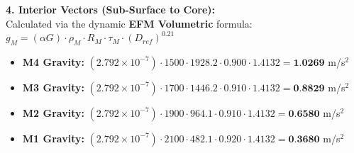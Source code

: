 \documentclass[11pt, a4paper]{article}
\begin{document}
  \vspace{0.5em}
  \noindent \textbf{4. Interior Vectors (Sub-Surface to Core):} \\[0.5em]
  \hspace*{1em} Calculated via the dynamic \textbf{EFM Volumetric} formula: $g_M = (\alpha G) \cdot \rho_{M} \cdot R_M \cdot \tau_M \cdot (D_{ref})^{0.21}$
  \begin{itemize}
    \item \textbf{M4 Gravity:} $(2.792 \times 10^{-7}) \cdot 1500 \cdot 1928.2 \cdot 0.900 \cdot 1.4132 = \textbf{1.0269}$ m/s$^2$
    \item \textbf{M3 Gravity:} $(2.792 \times 10^{-7}) \cdot 1700 \cdot 1446.2 \cdot 0.910 \cdot 1.4132 = \textbf{0.8829}$ m/s$^2$
    \item \textbf{M2 Gravity:} $(2.792 \times 10^{-7}) \cdot 1900 \cdot 964.1 \cdot 0.910 \cdot 1.4132 = \textbf{0.6580}$ m/s$^2$
    \item \textbf{M1 Gravity:} $(2.792 \times 10^{-7}) \cdot 2100 \cdot 482.1 \cdot 0.920 \cdot 1.4132 = \textbf{0.3680}$ m/s$^2$
  \end{itemize}
\end{document}
